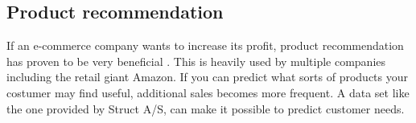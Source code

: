 \color{black}
\subsection{Product recommendation}
If an e-commerce company wants to increase its profit, product recommendation has proven to be very beneficial \cite{BigCommerce}. This is heavily used by multiple companies including the retail giant Amazon\cite{Fortune}. If you can predict what sorts of products your costumer may find useful, additional sales becomes more frequent. A data set like the one provided by Struct A/S, can make it possible to predict customer needs.